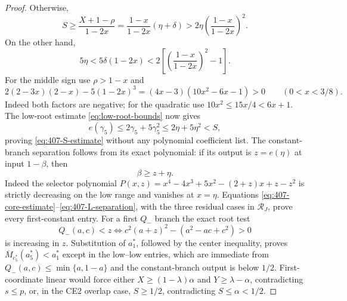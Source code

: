 \begin{proof}
Otherwise,
\[
 S\ge\frac{X+1-\rho}{1-2x}
 =\frac{1-x}{1-2x}(\eta+\delta)
 >2\eta\left(\frac{1-x}{1-2x}\right)^2.
\]
On the other hand,
\[
 5\eta<5\delta(1-2x)
 <2\left[\left(\frac{1-x}{1-2x}\right)^2-1\right].
\]
For the middle sign use $\rho>1-x$ and
\[
2(2-3x)(2-x)-5(1-2x)^3
 =(4x-3)(10x^2-6x-1)>0
 \qquad(0<x<3/8).
\]
Indeed both factors are negative; for the quadratic use
$10x^2\le15x/4<6x+1$.
The low-root estimate \eqref{eq:low-root-bounds} now gives
\[
 e(\gamma_5)\le2\gamma_5+5\gamma_5^2
 \le2\eta+5\eta^2<S,
\]
proving \eqref{eq:407-S-estimate} without any polynomial coefficient list.
The constant-branch separation follows from its exact polynomial: if its output is
$z=e(\eta)$ at input $1-\beta$, then
\[
 \beta\ge z+\eta.
 \label{eq:407-L-separation}
\]
Indeed the selector polynomial
$P(x,z)=x^4-4x^3+5x^2-(2+z)x+z-z^2$ is strictly decreasing on the low
range and vanishes at $x=\eta$.  Equations
\eqref{eq:407-core-estimate}--\eqref{eq:407-L-separation}, with the three
residual cases in $\mathcal R_J$, prove every first-constant entry.  For a first $Q_-$
branch the exact root test
\[
 Q_-(a,c)<z\iff c^2(a+z)^2-(a^2-ac+c^2)>0
\]
is increasing in $z$.  Substitution of $a_1^\ast$, followed by the center
inequality, proves $\overline M_{c_5^\ast}(a_5^\ast)<a_1^\ast$ except in the low--low entries, which
are immediate from $Q_-(a,c)\le\min\{a,1-a\}$ and the constant-branch output is below $1/2$.
First-coordinate linear would force either
$X\ge(1-\lambda)\alpha$ and $Y\ge\lambda-\alpha$, contradicting
$s\le p$, or, in the CE2 overlap case, $S\ge1/2$, contradicting
$S\le\alpha<1/2$.


\end{proof}
